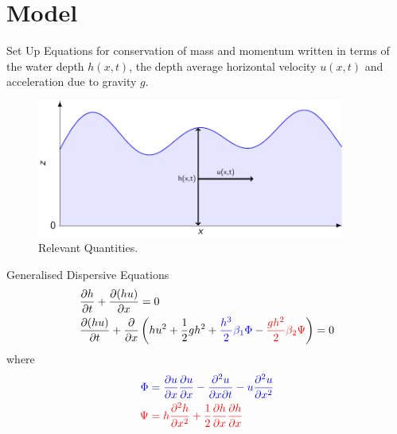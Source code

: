 \documentclass[pdf]{beamer}
\begin{document}
\section{Model}
\begin{frame}{Set Up}
Equations for conservation of mass and momentum written in terms of the water depth $h(x,t)$, the depth average horizontal velocity $u(x,t)$ and acceleration due to gravity $g$.
\begin{figure}
	\centering
	\includegraphics[width=0.9\textwidth]{./Pics/Tex/Explanatory/Setupplot/Waves.pdf}
	\caption{Relevant Quantities.}
\end{figure}
\end{frame}

\begin{frame}{Generalised Dispersive Equations}
\begin{align*}
&\dfrac{\partial h}{\partial t} + \dfrac{\partial (hu)}{\partial x} = 0\\
&\dfrac{\partial (hu)}{\partial t} + \dfrac{\partial }{\partial x} \left( hu^2 + \frac{1}{2}gh^2  +  {\color{blue} \frac{h^3}{2}\beta_1 \Phi } -   {\color{red} \frac{gh^2}{2} \beta_2 \Psi}  \right)= 0 \\
\end{align*}
where
\begin{align*}
\color{blue} \Phi  & \color{blue}= \frac{\partial u}{\partial x}\frac{\partial u}{\partial x} - \frac{\partial^2 u}{\partial x \partial t} - u\frac{\partial^2 u}{\partial x^2} \\
\color{red} \Psi & \color{red}= h \frac{\partial^2 h}{\partial x^2} + \frac{1}{2} \frac{\partial h}{\partial x}\frac{\partial h}{\partial x} 
\end{align*}
\end{frame}
\end{document}
